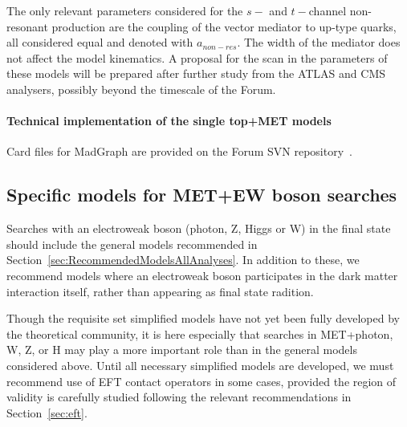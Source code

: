 \documentclass[a4,debug,notitlepage,nobib]{tufte-handout}
\newif\ifATLAS
\newif\ifCMS
\begin{document}
The only relevant parameters considered for the $s-$ and $t-$channel non-resonant production 
are the coupling of the vector mediator to up-type quarks, all considered equal and denoted with $a_{non-res}$. 
The width of the mediator does not affect the model kinematics. 
A proposal for the scan in the parameters of these models will be prepared after further study 
from the ATLAS and CMS analysers, possibly beyond the timescale of the Forum. 

\paragraph{Technical implementation of the single top+MET models} 

Card files for MadGraph are provided on the Forum SVN repository~\cite{ForumSVN_EWMonoTop}.


% 



\subsection{Specific models for MET+EW boson searches}

Searches with an electroweak boson (photon, Z, Higgs or W) in the
final state should include the general models recommended in
Section~\ref{sec:RecommendedModelsAllAnalyses}. In addition to these,
we recommend models where an electroweak boson participates in
the dark matter interaction itself, rather than appearing as final
state radition.

Though the requisite set simplified models have not yet been fully
developed by the theoretical community, it is here especially that
searches in MET+photon, W, Z, or H may play a more important role than
in the general models considered above. Until all necessary simplified models
are developed, we must recommend use of EFT contact operators
in some cases, provided the region of validity is carefully studied
following the relevant recommendations in Section~\ref{sec:eft}.

\end{document}
